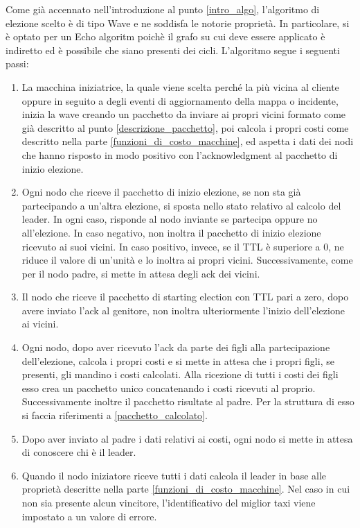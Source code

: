 Come già accennato nell'introduzione al punto \ref{intro_algo}, l'algoritmo di elezione scelto è di tipo Wave e ne soddisfa le notorie proprietà. In particolare, si è optato per un Echo algoritm poichè il grafo su cui deve essere applicato è indiretto ed è possibile che siano presenti dei cicli.
L'algoritmo segue i seguenti passi:

\begin{enumerate}
	\item La macchina iniziatrice, la quale viene scelta perché la più vicina al cliente oppure in seguito a degli eventi di aggiornamento della mappa o incidente, inizia la wave creando un pacchetto da inviare ai propri vicini formato come già descritto al punto \ref{descrizione_pacchetto}, poi calcola i propri costi come descritto nella parte \ref{funzioni_di_costo_macchine}, ed aspetta i dati dei nodi che hanno risposto in modo positivo con l'acknowledgment al pacchetto di inizio elezione.
	\item Ogni nodo che riceve il pacchetto di inizio elezione, se non sta già partecipando a un'altra elezione, si sposta nello stato relativo al calcolo del leader. In ogni caso, risponde al nodo inviante se partecipa oppure no all'elezione. In caso negativo, non inoltra il pacchetto di inizio elezione ricevuto ai suoi vicini. In caso positivo, invece, se il TTL è superiore a 0, ne riduce il valore di un'unità e lo inoltra ai propri vicini. Successivamente, come per il nodo padre, si mette in attesa degli ack dei vicini.
	\item Il nodo che riceve il pacchetto di starting election con TTL pari a zero, dopo avere inviato l'ack al genitore, non inoltra ulteriormente l'inizio dell'elezione ai vicini.
	\item Ogni nodo, dopo aver ricevuto l'ack da parte dei figli alla partecipazione dell'elezione, calcola i propri costi e si mette in attesa che i propri figli, se presenti, gli mandino i costi calcolati. Alla ricezione di tutti i costi dei figli esso crea un pacchetto unico concatenando i costi ricevuti al proprio. Successivamente inoltre il pacchetto risultate al padre. Per la struttura di esso si faccia riferimenti a \ref{pacchetto_calcolato}.
	\item Dopo aver inviato al padre i dati relativi ai costi, ogni nodo si mette in attesa di conoscere chi è il leader.
	\item Quando il nodo iniziatore riceve tutti i dati calcola il leader in base alle proprietà descritte nella parte \ref{funzioni_di_costo_macchine}. Nel caso in cui non sia presente alcun vincitore, l'identificativo del miglior taxi viene impostato a un valore di errore.

\end{enumerate}
